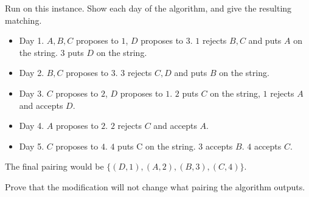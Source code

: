 \documentclass[11pt]{article}
\begin{document}
    \begin{Parts}
        \Part Run on this instance. Show each day of the algorithm, and give the resulting matching. 

        \begin{Answer}
            \begin{itemize}
                \item Day 1. $A,B,C$ proposes to $1$, $D$ proposes to $3$. $1$ rejects $B,C$ and puts $A$ on the string. $3$ puts $D$ on the string. 
                \item Day 2. $B,C$ proposes to $3$. $3$ rejects $C,D$ and puts $B$ on the string. 
                \item Day 3. $C$ proposes to $2$, $D$ proposes to $1$. $2$ puts $C$ on the string, $1$ rejects $A$ and accepts $D$. 
                \item Day 4. $A$ proposes to $2$. $2$ rejects $C$ and accepts $A$. 
                \item Day 5. $C$ proposes to $4$. $4$ puts C on the string. $3$ accepts $B$. $4$ accepts $C$. 
            \end{itemize}
            The final pairing would be $\{(D,1),(A,2),(B,3),(C,4)\}$.
        \end{Answer}

        \Part Prove that the modification will not change what pairing the algorithm outputs. 


\end{Parts}
\end{document}
